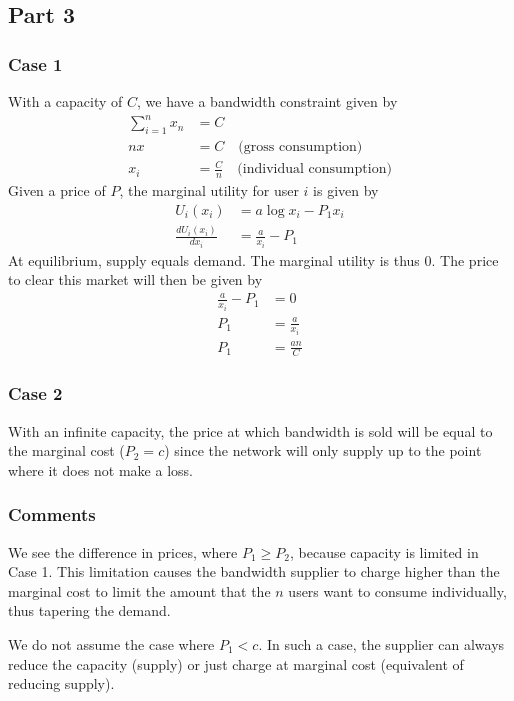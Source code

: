 \documentclass[]{article}
\newcommand{\e}{&=}
\begin{document}
\subsection*{Part 3}

\subsubsection*{Case 1}

With a capacity of $C$, we have a bandwidth constraint given by
\begin{align*}
\sum_{i=1}^{n} x_n \e C \\
nx \e C \quad \text{(gross consumption)} \\
x_i \e \frac{C}{n}  \quad \text{(individual consumption)}
\end{align*}
Given a price of $P$, the marginal utility for user $i$ is given by
\begin{align*}
U_i(x_i) \e a \log x_i - P_1x_i \\
\frac{dU_i(x_i)}{dx_i} \e \frac{a}{x_i} - P_1
\end{align*}
At equilibrium, supply equals demand. The marginal utility is thus 0. The price to clear this market will then be given by
\begin{align*}
\frac{a}{x_i} - P_1 \e 0 \\
P_1 \e \frac{a}{x_i} \\
P_1 \e \frac{an}{C}
\end{align*} 

\subsubsection*{Case 2}

With an infinite capacity, the price at which bandwidth is sold will be equal to the marginal cost ($P_2 = c$) since the network will only supply up to the point where it does not make a loss.

\subsubsection*{Comments}

We see the difference in prices, where $P_1 \geq P_2$, because capacity is limited in Case 1. This limitation causes the bandwidth supplier to charge higher than the marginal cost to limit the amount that the $n$ users want to consume individually, thus tapering the demand.

We do not assume the case where $P_1 < c$. In such a case, the supplier can always reduce the capacity (supply) or just charge at marginal cost (equivalent of reducing supply).
\end{document}
